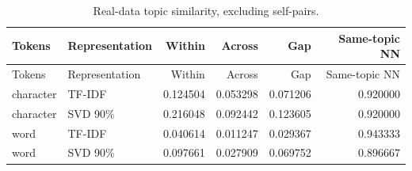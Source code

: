 {\small\renewcommand{\arraystretch}{1.05}
\begin{longtable}{llrrrr}
\caption{Real-data topic similarity, excluding self-pairs.}\\
\toprule
Tokens & Representation & Within & Across & Gap & Same-topic NN \\ \midrule\endfirsthead
\toprule
Tokens & Representation & Within & Across & Gap & Same-topic NN \\ \midrule\endhead
character & TF-IDF & 0.124504 & 0.053298 & 0.071206 & 0.920000 \\
character & SVD 90\% & 0.216048 & 0.092442 & 0.123605 & 0.920000 \\
word & TF-IDF & 0.040614 & 0.011247 & 0.029367 & 0.943333 \\
word & SVD 90\% & 0.097661 & 0.027909 & 0.069752 & 0.896667 \\
\bottomrule
\end{longtable}
}
